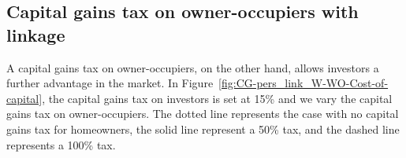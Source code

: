

   



\subsection{Capital gains tax on owner-occupiers  with linkage}

A capital gains tax on owner-occupiers, on the other hand, allows investors a further advantage in the market. In Figure~\ref{fig:CG-pers_link_W-WO-Cost-of-capital}, %
the capital gains tax on investors is set at 15\% and we vary the capital gains tax on owner-occupiers. The dotted line represents the case with no capital gains tax for homeowners, the solid line represent a 50\% tax, and the dashed line represents a 100\% tax.


